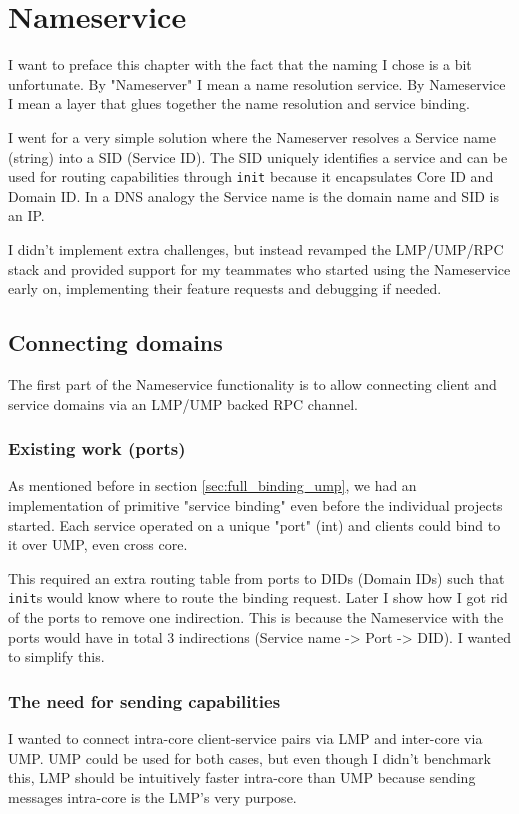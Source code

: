 \chapter{Nameservice}
I want to preface this chapter with the fact that the naming I chose is a bit unfortunate. By "Nameserver" I mean a name resolution service. By Nameservice I mean a layer that glues together the name resolution and service binding.

I went for a very simple solution where the Nameserver resolves a Service name (string) into a SID (Service ID). The SID uniquely identifies a service and can be used for routing capabilities through \texttt{init} because it encapsulates Core ID and Domain ID. In a DNS analogy the Service name is the domain name and SID is an IP.

I didn't implement extra challenges, but instead revamped the LMP/UMP/RPC stack and provided support for my teammates who started using the Nameservice early on, implementing their feature requests and debugging if needed.

\section{Connecting domains}
The first part of the Nameservice functionality is to allow connecting client and service domains via an LMP/UMP backed RPC channel.

\subsection{Existing work (ports)}
As mentioned before in section \ref{sec:full_binding_ump}, we had an implementation of primitive "service binding" even before the individual projects started. Each service operated on a unique "port" (int) and clients could bind to it over UMP, even cross core.

This required an extra routing table from ports to DIDs (Domain IDs) such that \texttt{init}s would know where to route the binding request. Later I show how I got rid of the ports to remove one indirection. This is because the Nameservice with the ports would have in total 3 indirections (Service name -> Port -> DID). I wanted to simplify this.

\subsection{The need for sending capabilities}
I wanted to connect intra-core client-service pairs via LMP and inter-core via UMP. UMP could be used for both cases, but even though I didn't benchmark this, LMP should be intuitively faster intra-core than UMP because sending messages intra-core is the LMP's very purpose.

